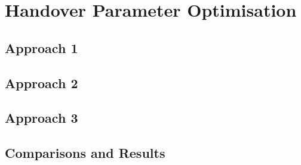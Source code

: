 \chapter{Handover Parameter Optimisation}\label{handover parameter optimisation}
\section{Approach 1}\label{approach1}
\section{Approach 2}\label{approach2}
\section{Approach 3}\label{approach3}
\section{Comparisons and Results}\label{results}